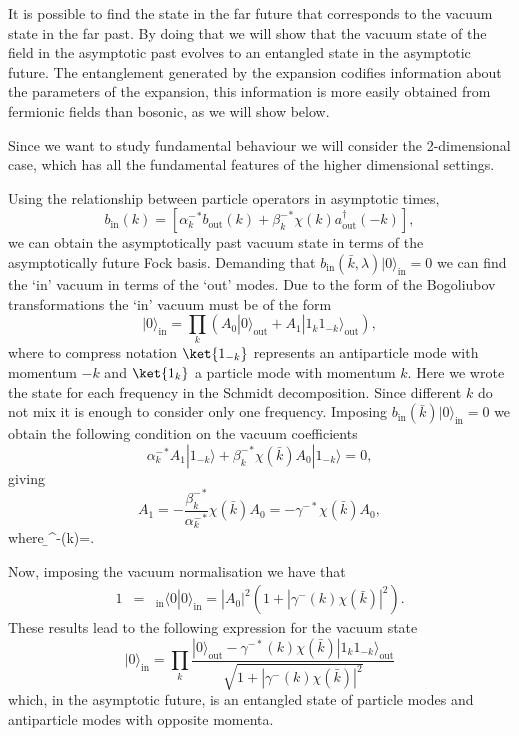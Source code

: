 It is possible to find the state in the far future that
corresponds to the vacuum state in the far past. By doing that we will show that the vacuum state of the field in the asymptotic past evolves to an entangled state in the asymptotic future. The entanglement generated by the expansion codifies information about the parameters of the expansion, this information is more easily obtained from fermionic fields than bosonic, as we will show below.

Since we want to study fundamental behaviour we will consider the 2-dimensional case, which has all the fundamental features of the higher dimensional settings. 
 
 Using the relationship between particle operators in asymptotic times,
 \begin{equation}
b_{\text{in}}(k)=\left[{\alpha^{-}_{k}}^{\ast}b_{\text{out}}(k)+{\beta^{-}_{k}}^{\ast}%
\chi(k)a_{\text{out}}^{\dagger}(-k)\right],
\end{equation}
 we can obtain the asymptotically past vacuum state in terms of the asymptotically future Fock basis. Demanding that
$b_{\text{in}}(\bar{k},\lambda)|0\rangle_{\text{in}}=0$ we can find the `in'
vacuum in terms of the `out' modes. Due to the form of the Bogoliubov transformations the `in' vacuum must be of the form 
\begin{equation}
|0\rangle_{\text{in}}=\prod_{k}(A_{0}|0
\rangle_{\text{out}}+A_{1}|1_{k} 1_{-k}\rangle_{\text{out}} ),
\end{equation}
where  to compress notation $\ket{1_{-k}}$ represents an antiparticle mode with momentum $-k$ and $\ket{1_k}$ a particle mode with momentum $k$. Here we wrote
the state for each frequency in the Schmidt decomposition. Since
different $k$ do not mix it is enough to consider only one
frequency.  Imposing $b_{\text{in}}(\bar{k})|0\rangle_{\text{in}}
=0$ we obtain the following condition on the vacuum coefficients
\begin{equation}
{\alpha^{-}_{k}}^*A_{1}|1_{-k}\rangle+
{\beta^{-}_{k}}^*\chi(\bar{k} )A_{0}|1_{-k}\rangle=0,
\end{equation}
giving
\begin{equation}
A_{1}=-\frac{ {\beta^{-}_{k}}^*}{{\alpha^{-}_{k}}^*}\chi(\bar{k}
)A_{0}=-\gamma^{-\ast}\chi(\bar{k})A_{0},
\end{equation} where
\b\gamma^{-\ast}({k})=.\e 

Now, imposing the vacuum
normalisation we have that
\begin{eqnarray}
1&=&_{\text{in}}\langle 0|0\rangle_{\text{in}}=|A_{0}|^{2}(1+|\gamma^{-}({k})\chi(\bar{k}%
)|^{2}).
\end{eqnarray}
These results lead to the following expression for the vacuum state 
\begin{equation}
|0\rangle_{\text{in}}=\prod_{k}\frac{|0\rangle_{\text{out}}-\gamma^{-\ast}({k})\chi(\bar{k})|1_{k}
1_{-k}\rangle_{\text{out}} }{\sqrt{1+|\gamma^{-}({k})\chi(\bar{k})|^{2}}}
 \label{vacin}
\end{equation}
which, in the asymptotic future, is an entangled state of particle modes and antiparticle modes with opposite momenta.


